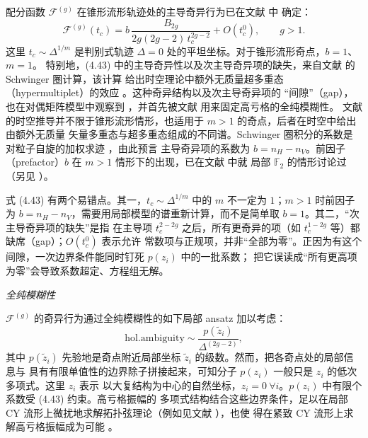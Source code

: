 配分函数 $\mathcal{F}^{(g)}$ 在锥形流形轨迹处的主导奇异行为已在文献 \cite{ref18,ref19,ref85,ref86,ref13,ref14} 中
确定：
\begin{equation}\tag{4.43}
\mathcal{F}^{(g)}(t_c)
= b\,\frac{B_{2g}}{2g(2g-2)\,t_c^{2g-2}} + O(t_c^0),
\qquad g>1 .
\end{equation}
这里 $t_c\sim\Delta^{1/m}$ 是判别式轨迹 $\Delta=0$ 处的平坦坐标。对于锥形流形奇点，$b=1$、$m=1$。
特别地，(4.43) 中的主导奇异性以及次主导奇异项的缺失，来自文献 \cite{ref13,ref14} 的 Schwinger 圈计算，该计算
给出时空理论中额外无质量超多重态（hypermultiplet）的效应 \cite{ref87}。这种奇异结构以及次主导奇异项的
“间隙”（gap），也在对偶矩阵模型中观察到 \cite{ref88}，并首先被文献 \cite{ref89,ref90} 用来固定高亏格的全纯模糊性。
文献 \cite{ref13,ref14} 的时空推导并不限于锥形流形情形，也适用于 $m>1$ 的奇点，后者在时空中给出由额外无质量
矢量多重态与超多重态组成的不同谱。Schwinger 圈积分的系数是对粒子自旋的加权求迹 \cite{ref87,ref86}，由此预言
主导奇异项的系数为 $b=n_H-n_V$。前因子（prefactor）$b$ 在 $m>1$ 情形下的出现，已在文献 \cite{ref26} 中就
局部 $\mathbb{F}_2$ 的情形讨论过（另见 \cite{ref91}）。

\begin{yizhu}[易错点]
式 (4.43) 有两个易错点。其一，$t_c\sim\Delta^{1/m}$ 中的 $m$ 不一定为 $1$；$m>1$ 时前因子为
$b=n_H-n_V$，需要用局部模型的谱重新计算，而不是简单取 $b=1$。其二，“次主导奇异项的缺失”是指
在主导项 $t_c^{2-2g}$ 之后，所有更奇异的项（如 $t_c^{1-2g}$ 等）都缺席（gap）；$O(t_c^0)$ 表示允许
常数项与正规项，并非“全部为零”。正因为有这个间隙，一次边界条件能同时钉死 $p(z_i)$ 中的一批系数；
把它误读成“所有更高项为零”会导致系数超定、方程组无解。
\end{yizhu}


\medskip
\noindent\emph{全纯模糊性}\par

$\mathcal{F}^{(g)}$ 的奇异行为通过全纯模糊性的如下局部 ansatz 加以考虑：
\begin{equation}\tag{4.44}
\mathrm{hol.ambiguity} \sim \frac{p(\tilde z_i)}{\Delta^{(2g-2)}} ,
\end{equation}
其中 $p(\tilde z_i)$ 先验地是奇点附近局部坐标 $\tilde z_i$ 的级数。然而，把各奇点处的局部信息与
具有有限单值性的边界除子拼接起来，可知分子 $p(z_i)$ 一般只是 $z_i$ 的低次多项式。这里 $z_i$ 表示
以大复结构为中心的自然坐标，$z_i=0\ \forall i$。$p(z_i)$ 中有限个系数受 (4.43) 约束。高亏格振幅的
多项式结构结合这些边界条件，足以在局部 CY 流形上微扰地求解拓扑弦理论（例如见文献 \cite{ref92,ref26}），也使
得在紧致 CY 流形上求解高亏格振幅成为可能 \cite{ref90,ref91,ref28}。

